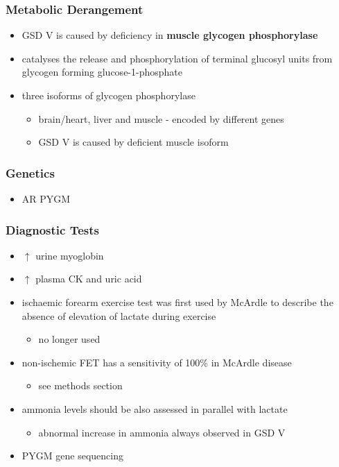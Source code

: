 \documentclass{scrartcl}
\begin{document}
\subsubsection{Metabolic Derangement}
\label{sec:orgbaffa1c}
\begin{itemize}
\item GSD V is caused by deficiency in \textbf{muscle glycogen phosphorylase}
\item catalyses the release and phosphorylation of terminal glucosyl units
from glycogen forming glucose-1-phosphate
\item three isoforms of glycogen phosphorylase
\begin{itemize}
\item brain/heart, liver and muscle - encoded by different genes
\item GSD V is caused by deficient muscle isoform
\end{itemize}
\end{itemize}

\subsubsection{Genetics}
\label{sec:org39ea776}
\begin{itemize}
\item AR PYGM
\end{itemize}

\subsubsection{Diagnostic Tests}
\label{sec:org3ac3b9f}
\begin{itemize}
\item \(\uparrow\) urine myoglobin
\item \(\uparrow\) plasma CK and uric acid
\item ischaemic forearm exercise test was first used by McArdle to
describe the absence of elevation of lactate during exercise
\begin{itemize}
\item no longer used
\end{itemize}
\item non-ischemic FET has a sensitivity of 100\% in McArdle disease
\begin{itemize}
\item see methods section
\end{itemize}
\item ammonia levels should be also assessed in parallel with lactate
\begin{itemize}
\item abnormal increase in ammonia always observed in GSD V
\end{itemize}
\item PYGM gene sequencing
\end{itemize}
\end{document}
